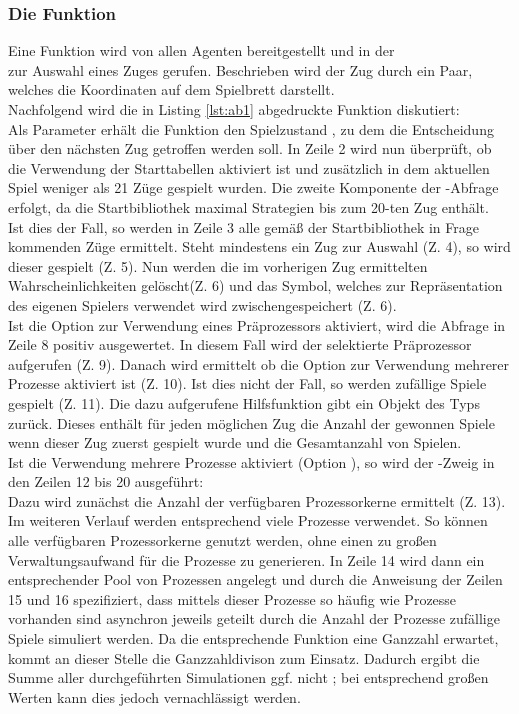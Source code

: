 \subsubsection{Die Funktion }
\label{mc-getmove}
Eine Funktion  wird von allen Agenten bereitgestellt und in der \\ zur Auswahl eines Zuges gerufen. Beschrieben wird der Zug durch ein Paar, welches die Koordinaten auf dem Spielbrett darstellt.
\\Nachfolgend wird die in Listing \ref{lst:ab1} abgedruckte Funktion diskutiert:
\vspace{0.5cm}
\\Als Parameter erhält die Funktion den Spielzustand , zu dem die Entscheidung über den nächsten Zug getroffen werden soll. In Zeile 2 wird nun überprüft, ob die Verwendung der Starttabellen aktiviert ist und zusätzlich in dem aktuellen Spiel weniger als 21 Züge gespielt wurden. Die zweite Komponente der -Abfrage erfolgt, da die Startbibliothek maximal Strategien bis zum 20-ten Zug enthält.
\\Ist dies der Fall, so werden in Zeile 3 alle gemäß der Startbibliothek in Frage kommenden Züge ermittelt. Steht mindestens ein Zug zur Auswahl (Z. 4), so wird dieser gespielt (Z. 5). Nun werden die im vorherigen Zug ermittelten Wahrscheinlichkeiten gelöscht(Z. 6) und das Symbol, welches zur Repräsentation des eigenen Spielers verwendet wird zwischengespeichert (Z. 6).
\\Ist die Option zur Verwendung eines Präprozessors aktiviert, wird die Abfrage in Zeile 8 positiv ausgewertet. In diesem Fall wird der selektierte Präprozessor aufgerufen (Z. 9). Danach wird ermittelt ob die Option zur Verwendung mehrerer Prozesse aktiviert ist (Z. 10). Ist dies nicht der Fall, so werden  zufällige Spiele gespielt (Z. 11). Die dazu aufgerufene Hilfsfunktion gibt ein Objekt des Typs  zurück. Dieses enthält für jeden möglichen Zug die Anzahl der gewonnen Spiele wenn dieser Zug zuerst gespielt wurde und die Gesamtanzahl von Spielen.\\
Ist die Verwendung mehrere Prozesse aktiviert (Option ), so wird der -Zweig in den Zeilen 12 bis 20 ausgeführt:
\\Dazu wird zunächst die Anzahl der verfügbaren Prozessorkerne ermittelt (Z. 13). Im weiteren Verlauf werden entsprechend viele Prozesse verwendet. So können alle verfügbaren Prozessorkerne genutzt werden, ohne einen zu großen Verwaltungsaufwand für die Prozesse zu generieren. In Zeile 14 wird dann ein entsprechender Pool von Prozessen angelegt und durch die Anweisung der Zeilen 15 und 16 spezifiziert, dass mittels dieser Prozesse so häufig wie Prozesse vorhanden sind asynchron jeweils  geteilt durch die Anzahl der Prozesse zufällige Spiele simuliert werden. Da die entsprechende Funktion eine Ganzzahl erwartet, kommt an dieser Stelle die Ganzzahldivison \code{//} zum Einsatz. Dadurch ergibt die Summe aller durchgeführten Simulationen ggf. nicht ; bei entsprechend großen Werten kann dies jedoch vernachlässigt werden.
